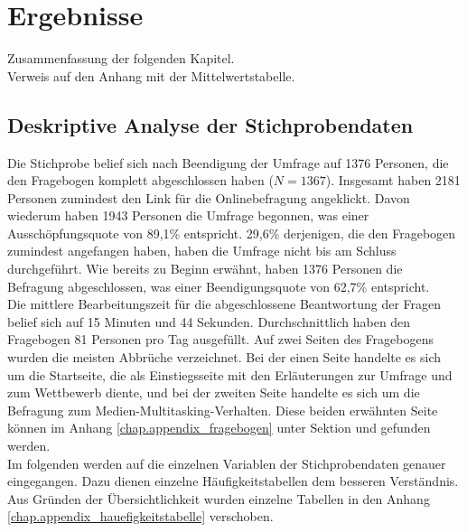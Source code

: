 %
%
\let\raggedsection\centering 
\chapter{Ergebnisse}
\let\raggedsection\raggedright 
\glsresetall
Zusammenfassung der folgenden Kapitel.\\
Verweis auf den Anhang mit der Mittelwertstabelle.
\section{Deskriptive Analyse der Stichprobendaten}
\label{label.stichprobe}
Die Stichprobe belief sich nach Beendigung der Umfrage auf 1376 Personen, die den Fragebogen komplett abgeschlossen haben ($N = 1367$). Insgesamt haben 2181 Personen zumindest den Link für die Onlinebefragung angeklickt. Davon wiederum haben 1943 Personen die Umfrage begonnen, was einer Ausschöpfungsquote von 89,1\% entspricht. 29,6\% derjenigen, die den Fragebogen zumindest angefangen haben, haben die Umfrage nicht bis am Schluss durchgeführt. Wie bereits zu Beginn erwähnt, haben 1376 Personen die Befragung abgeschlossen, was einer Beendigungsquote von 62,7\% entspricht.\\
Die mittlere Bearbeitungszeit für die abgeschlossene Beantwortung der Fragen belief sich auf 15 Minuten und 44 Sekunden. Durchschnittlich haben den Fragebogen 81 Personen pro Tag ausgefüllt. Auf zwei Seiten des Fragebogens wurden die meisten Abbrüche verzeichnet. Bei der einen Seite handelte es sich um die Startseite, die als Einstiegsseite mit den Erläuterungen zur Umfrage und zum Wettbewerb diente, und bei der zweiten Seite handelte es sich um die Befragung zum Medien-Multitasking-Verhalten. Diese beiden erwähnten Seite können im Anhang \ref{chap.appendix_fragebogen} unter Sektion  und  gefunden werden.\\
Im folgenden werden auf die einzelnen Variablen der Stichprobendaten genauer eingegangen. Dazu dienen einzelne Häufigkeitstabellen dem besseren Verständnis. Aus Gründen der Übersichtlichkeit wurden einzelne Tabellen in den Anhang \ref{chap.appendix_hauefigkeitstabelle} verschoben.
